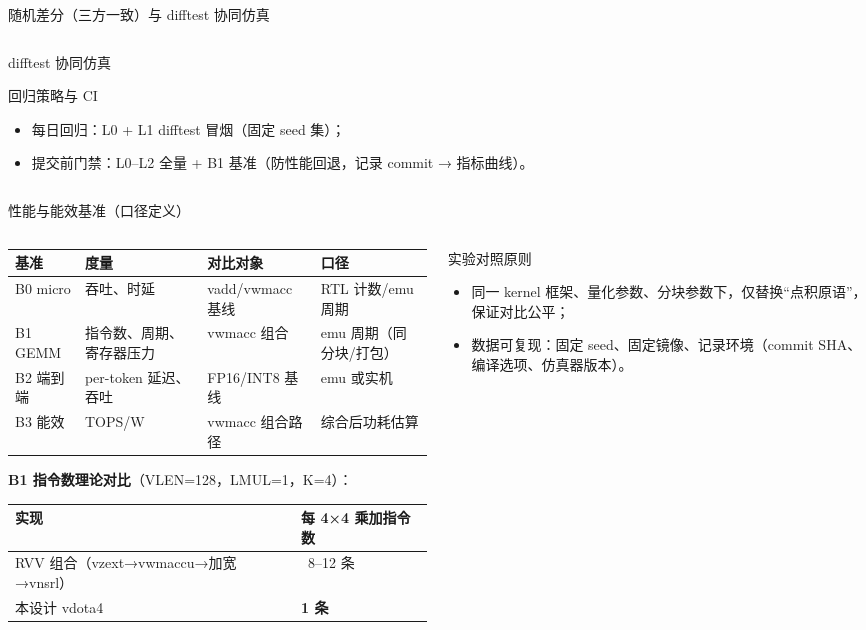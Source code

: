 \documentclass[aspectratio=169]{beamer}
\newcommand{\smalltable}[1]{\par\centering\scriptsize #1\par}
\begin{document}
\begin{frame}{随机差分（三方一致）与 difftest 协同仿真}
\begin{columns}[T]
\begin{column}{0.48\textwidth}
\begin{block}{difftest 协同仿真}
\begin{itemize}
\end{itemize}
\end{block}
\begin{block}{回归策略与 CI}
\begin{itemize}
  \item 每日回归：L0 + L1 difftest 冒烟（固定 seed 集）；
  \item 提交前门禁：L0–L2 全量 + B1 基准（防性能回退，记录 commit → 指标曲线）。
\end{itemize}
\end{block}
\end{column}
\end{columns}
\end{frame}

\begin{frame}{性能与能效基准（口径定义）}
\vspace{-0.65em}
\begin{columns}[T]
\begin{column}{0.5\textwidth}
\smalltable{%
\begin{tabular}{@{}llll@{}}
\toprule
基准 & 度量 & 对比对象 & 口径 \\
\midrule
B0 micro & 吞吐、时延 & vadd/vwmacc 基线 & RTL 计数/emu 周期 \\
B1 GEMM & 指令数、周期、寄存器压力 & vwmacc 组合 & emu 周期（同分块/打包） \\
B2 端到端 & per-token 延迟、吞吐 & FP16/INT8 基线 & emu 或实机 \\
B3 能效 & TOPS/W & vwmacc 组合路径 & 综合后功耗估算 \\
\bottomrule
\end{tabular}}
\vspace{0.4em}
\textbf{B1 指令数理论对比}（VLEN=128，LMUL=1，K=4）：
\smalltable{%
\begin{tabular}{@{}ll@{}}
\toprule
实现 & 每 4×4 乘加指令数 \\
\midrule
RVV 组合（vzext→vwmaccu→加宽→vnsrl） & ~8–12 条 \\
本设计 vdota4 & \textbf{1 条} \\
\bottomrule
\end{tabular}}
\end{column}
\begin{column}{0.48\textwidth}
\begin{block}{实验对照原则}
\begin{itemize}
  \item 同一 kernel 框架、量化参数、分块参数下，仅替换“点积原语”，保证对比公平；
  \item 数据可复现：固定 seed、固定镜像、记录环境（commit SHA、编译选项、仿真器版本）。

\end{itemize}
\end{block}
\end{column}
\end{columns}
\end{frame}
\end{document}
